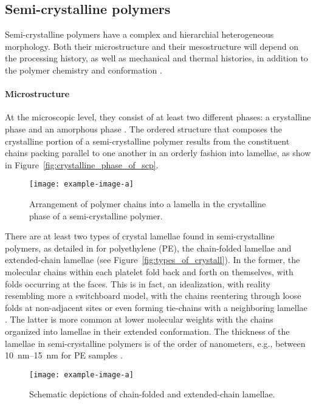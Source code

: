 \subsection{Semi-crystalline polymers}

Semi-crystalline polymers have a complex and hierarchial heterogeneous morphology.
Both their microstructure and their mesostructure will depend on the processing history, as well as mechanical and thermal histories, in addition to the polymer chemistry and conformation \citep{khouryMorphologyCrystallineSynthetic1976,cangemiTwoPhaseModelMechanical2001,hoffmanAnalysisRelaxationsPolychlorotrifluoroethylene2007}.

\paragraph{Microstructure}
At the microscopic level, they consist of at least two different phases: a crystalline phase and an amorphous phase \citep{khouryMorphologyCrystallineSynthetic1976}.
The ordered structure that composes the crystalline portion of a semi-crystalline polymer results from the constituent chains packing parallel to one another in an orderly fashion into lamellae, as show in Figure~\eqref{fig:crystalline_phase_of_scp}.

\begin{figure}[htbp]
	\texttt{[image: example-image-a]}
	\caption{Arrangement of polymer chains into a lamella in the crystalline phase of a semi-crystalline polymer.}
\label{fig:crystalline_phase_of_scp}
\end{figure}

There are at least two types of crystal lamellae found in semi-crystalline polymers, as detailed in \cite{andersonMorphologyIsothermallyBulk1964} for polyethylene (PE), the  chain-folded lamellae and extended-chain lamellae (see Figure~\eqref{fig:types_of_crystall}).
In the former, the molecular chains within each platelet fold back and forth on themselves, with folds occurring at the faces.
This is in fact, an idealization, with reality resembling more a switchboard model, with the chains reentering through loose folds at non-adjacent sites or even forming tie-chains with a neighboring lamellae \citep{gsellEvolutionMicrostructureSemicrystalline1994}.
The latter is more common at lower molecular weights with the chains organized into lamellae in their extended conformation.
The thickness of the lamellae in semi-crystalline polymers is of the order of nanometers, e.g., between \SIrange{10}{15}{\nano\meter} for PE samples \citep{argonPhysicsDeformationFracture2013a}.
\begin{figure}[hbtp]
	\texttt{[image: example-image-a]}
	\caption{Schematic depictions of chain-folded and extended-chain lamellae.}
\label{fig:types_of_crystall}
\end{figure}

